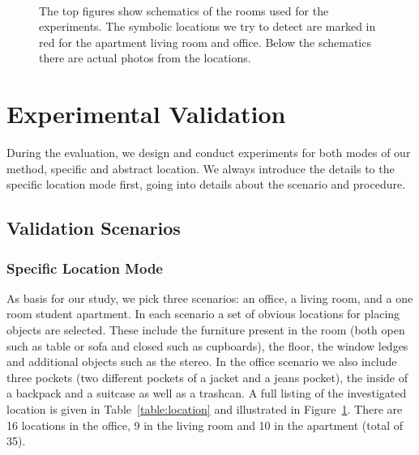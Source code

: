 \begin{figure}[t]
  \begin{center}
	\\
   \end{center}
\vspace{-10pt}
\caption[Experiment environment]{The top figures show schematics of the rooms used for the experiments. 
The symbolic locations we try to detect are marked in red for the apartment living room and office. 
Below the schematics there are actual photos from the locations.}
\label{fig:experiment}
\end{figure} 


\section{Experimental Validation}
\label{sec:experimental}
During the evaluation, we design and conduct experiments for both modes of our method,
specific and abstract location. We always introduce the details to the specific location mode first,
going into details about the scenario and procedure.


\subsection{Validation Scenarios}
\subsubsection{Specific Location Mode}
As basis for our study, we pick three scenarios: 
an office, a living room, and a
one room student apartment. In each scenario a set of obvious locations
for placing objects are selected. These include the
furniture present in the room (both open such as table or sofa and
closed such as cupboards), the floor, the window ledges and additional
objects such as the stereo. In the
office scenario we also include three pockets (two different
pockets of a jacket and a jeans pocket), the inside of a backpack
and a suitcase as well as a trashcan. 
A full listing of the investigated location is given in
Table~\ref{table:location} and illustrated in
Figure~\ref{fig:experiment}. There are 16 locations in the
office, 9 in the living room and 10 in the apartment (total of 35).


